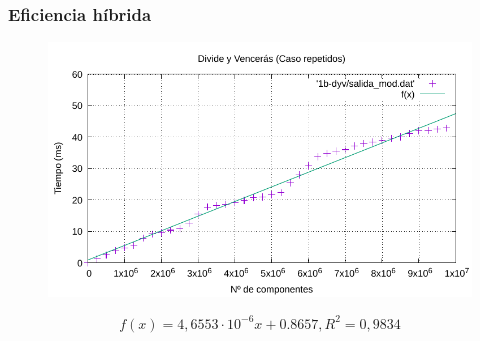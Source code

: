 \documentclass[13pt]{beamer}
\begin{document}
\begin{frame}
\begin{columns}

        \end{columns}
    \end{frame}

    \begin{frame}
        \frametitle{Eficiencia híbrida}
        \begin{figure}
            \centering
            \includegraphics[scale=0.8]{img/e1b-dyv}
        \end{figure}

        \begin{equation*}
            \boxed{f(x) = 4,6553 \cdot 10^{-6} x + 0.8657, R^2 = 0,9834}
            \label{eq:1b-dyv-eficiencia}
        \end{equation*}
    \end{frame}
\end{document}
